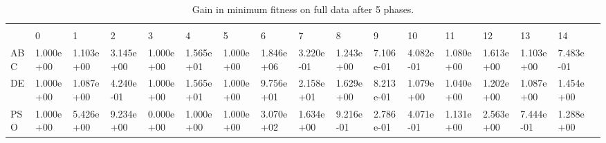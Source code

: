 \begin{landscape}
\begin{table}[]
\centering
\caption{Gain in minimum fitness on full data after 5 phases.}
\label{table:5phaseminfull}
\begin{adjustbox}{width=1.7\textwidth}
\begin{tabular}{lllllllllllllllll}
            &           &           &           &           &           &           &           &           &           &           &           &           &           &           &           &  \\
           & 0         & 1         & 2         & 3         & 4         & 5         & 6         & 7         & 8         & 9         & 10        & 11        & 12        & 13        & 14        &  \\
ABC                 & 1.000e+00 & 1.103e+00 & 3.145e+00 & 1.000e+00 & 1.565e+01 & 1.000e+00 & 1.846e+06 & 3.220e-01 & 1.243e+00 & 7.106e-01 & 4.082e-01 & 1.080e+00 & 1.613e+00 & 1.103e+00 & 7.483e-01 &  \\
DE                  & 1.000e+00 & 1.087e+00 & 4.240e-01 & 1.000e+00 & 1.565e+01 & 1.000e+00 & 9.756e+01 & 2.158e+01 & 1.629e+00 & 8.213e-01 & 1.079e+00 & 1.040e+00 & 1.202e+00 & 1.087e+00 & 1.454e+00 &  \\
PSO                 & 1.000e+00 & 5.426e+00 & 9.234e+00 & 0.000e+00 & 1.000e+00 & 1.000e+00 & 3.070e+02 & 1.634e+00 & 9.216e-01 & 2.786e-01 & 4.071e-01 & 1.131e+00 & 2.563e+00 & 7.444e-01 & 1.288e+00 &  \\

\end{tabular}
\end{adjustbox}
\end{table}


\end{landscape}

